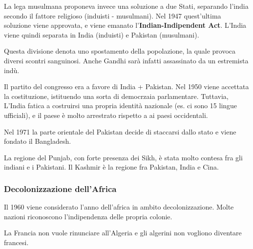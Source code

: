 \documentclass[a4paper]{article}
\begin{document}
La lega musulmana proponeva invece una soluzione a due Stati,
separando l'india secondo il fattore religioso (induisti - musulmani).
Nel 1947 quest'ultima soluzione viene approvata, e viene emanato
l'\textbf{Indian-Indipendent Act}. 
L'India viene quindi separata in India (induisti) e Pakistan (musulmani).

Questa divisione denota uno spostamento della popolazione,
la quale provoca diversi scontri sanguinosi.
Anche Gandhi sarà infatti assassinato da un estremista indù.


Il partito del congresso era a favore di India + Pakistan. 
Nel 1950 viene accettata la costituzione, istituendo una sorta di democrzaia parlamentare.
Tuttavia, L'India fatica a costruirsi una propria identità nazionale (es. ci sono 15 lingue ufficiali),
e il paese è molto arrestrato rispetto a ai paesi occidentali.

Nel 1971 la parte orientale del Pakistan decide di staccarsi dallo stato e viene fondato
il Bangladesh.


La regione del Punjab, con forte presenza dei Sikh, è stata molto contesa fra gli
indiani e i Pakistani.
Il Kashmir è la regione fra Pakistan, India e Cina.















\subsubsection{Decolonizzazione dell'Africa}

Il 1960 viene considerato l'anno dell'africa in ambito decolonizzazione.
Molte nazioni riconoscono l'indipendenza delle propria colonie.


La Francia non vuole rinunciare all'Algeria e gli algerini non vogliono diventare francesi.
\end{document}
